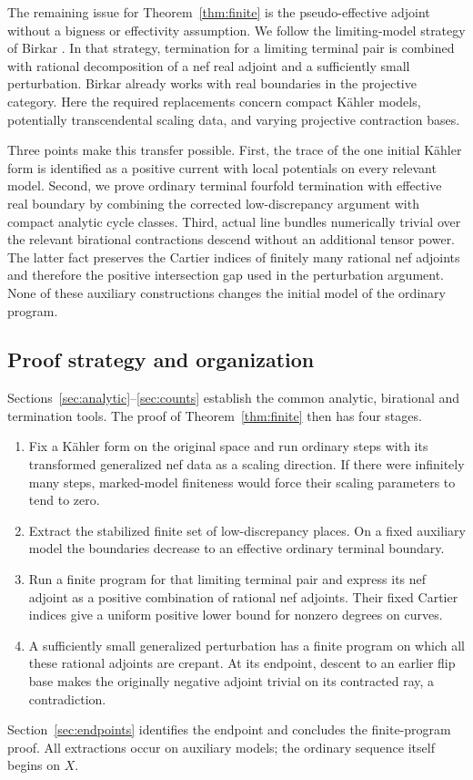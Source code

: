 The remaining issue for Theorem~\ref{thm:finite} is the
pseudo-effective adjoint without a bigness or effectivity assumption.
We follow the limiting-model strategy of Birkar
\cite[Theorem~1.2 and Section~4]{Birkar2009}. In that strategy,
termination for a limiting terminal pair is combined with rational
decomposition of a nef real adjoint and a sufficiently small
perturbation. Birkar already works with real boundaries in the
projective category. Here the required replacements concern compact
Kähler models, potentially transcendental scaling data, and varying
projective contraction bases.

Three points make this transfer possible. First, the trace of the one
initial Kähler form is identified as a positive current with local
potentials on every relevant model. Second, we prove ordinary terminal
fourfold termination with effective real boundary by combining the
corrected low-discrepancy argument with compact analytic cycle classes.
Third, actual line bundles numerically trivial over the relevant
birational contractions descend without an additional tensor power.
The latter fact preserves the Cartier indices of finitely many rational
nef adjoints and therefore the positive intersection gap used in the
perturbation argument. None of these auxiliary constructions changes
the initial model of the ordinary program.

\subsection{Proof strategy and organization}

Sections~\ref{sec:analytic}--\ref{sec:counts} establish the common
analytic, birational and termination tools. The proof of
Theorem~\ref{thm:finite} then has four stages.
\begin{enumerate}[label=\textup{\arabic*.}]
\item Fix a Kähler form on the original space and run ordinary steps
with its transformed generalized nef data as a scaling direction.
If there were infinitely many steps, marked-model finiteness would
force their scaling parameters to tend to zero.
\item Extract the stabilized finite set of low-discrepancy places.
On a fixed auxiliary model the boundaries decrease to an effective
ordinary terminal boundary.
\item Run a finite program for that limiting terminal pair and
express its nef adjoint as a positive combination of rational nef
adjoints. Their fixed Cartier indices give a uniform positive lower
bound for nonzero degrees on curves.
\item A sufficiently small generalized perturbation has a finite
program on which all these rational adjoints are crepant. At its
endpoint, descent to an earlier flip base makes the originally
negative adjoint trivial on its contracted ray, a contradiction.
\end{enumerate}
Section~\ref{sec:endpoints} identifies the endpoint and concludes the
finite-program proof. All extractions occur on auxiliary models;
the ordinary sequence itself begins on $X$.

